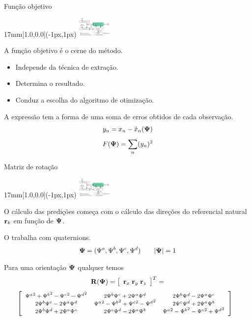 \begin{frame}{Função objetivo}
  \begin{textblock*}{17mm}[1.0,0.0](\paperwidth-1px,1px)
    \includegraphics[width=17mm]{blocos_s3.png}
  \end{textblock*}

  A função objetivo é o cerne do método.\\
  \begin{itemize}
  \item Independe da técnica de extração.
  \item Determina o resultado.
  \item Conduz a escolha do algoritmo de otimização.
  \end{itemize}
  
  A expressão tem a forma de uma soma de erros obtidos de cada observação.
  \[
  y_n = x_n - \hat{x}_n({\boldsymbol{\Psi}})
  \]\[
  F({\boldsymbol{\Psi}}) = \sum_n (y_n)^2
  \]
\end{frame}

\begin{frame}{Matriz de rotação}
  \begin{textblock*}{17mm}[1.0,0.0](\paperwidth-1px,1px)
    \includegraphics[width=17mm]{blocos_s3.png}
  \end{textblock*}

  O cálculo das predições começa com o cálculo das direções do referencial
  natural ${\mathbf{r}}_k$ em função de ${\boldsymbol{\Psi}}$.
  
  O \corisco trabalha com quaternions.
  \[
  {\boldsymbol{\Psi}} = ({\Psi^a}, {\Psi^b}, {\Psi^c}, {\Psi^d}) \qquad |{\boldsymbol{\Psi}}|=1
  \]
  
  Para uma orientação ${\boldsymbol{\Psi}}$ qualquer temos
  \[
  \mathbf{R}({\boldsymbol{\Psi}}) =
  \left[
    \begin{array}{l}
      {\mathbf{r}}_x\;
      {\mathbf{r}}_y\;
      {\mathbf{r}}_z
    \end{array}
  \right]^T = 
  \]
  \[\hspace{-.8em}\footnotesize
  \left[
    \begin{array}{ccc}
      {\Psi^a}^2+{\Psi^b}^2-{\Psi^c}^2-{\Psi^d}^2 &2{\Psi^b}{\Psi^c}+2{\Psi^a}{\Psi^d} & 2{\Psi^b}{\Psi^d}-2{\Psi^a}{\Psi^c}\\
      2{\Psi^b}{\Psi^c}-2{\Psi^a}{\Psi^d}& {\Psi^a}^2-{\Psi^b}^2+{\Psi^c}^2-{\Psi^d}^2&2{\Psi^c}{\Psi^d}+2{\Psi^a}{\Psi^b}\\
      2{\Psi^b}{\Psi^d}+2{\Psi^a}{\Psi^c}& 2{\Psi^c}{\Psi^d}-2{\Psi^a}{\Psi^b}& {\Psi^a}^2-{\Psi^b}^2-{\Psi^c}^2+{\Psi^d}^2\\
    \end{array}
  \right]
  \]
\end{frame}

